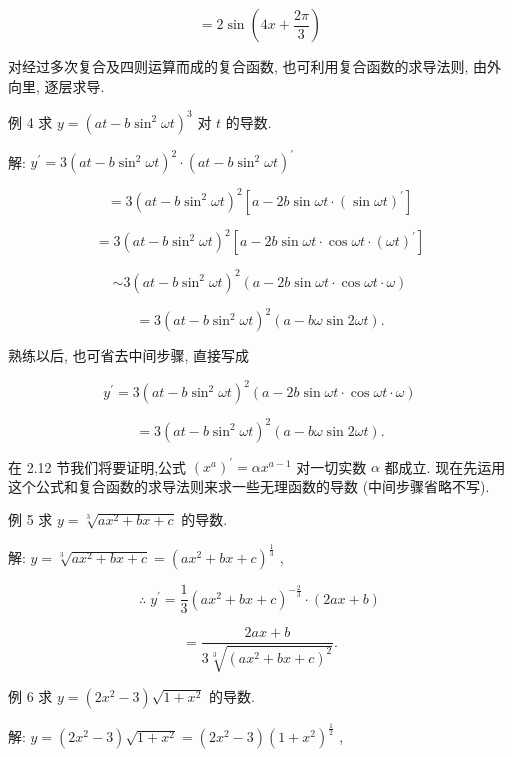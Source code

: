 \documentclass[lang=cn,newtx,12pt,scheme=chinese]{elegantbook}
\begin{document}
\[
= 2\sin \left( {{4x} + \frac{2\pi }{3}}\right)
\]

对经过多次复合及四则运算而成的复合函数, 也可利用复合函数的求导法则, 由外向里, 逐层求导.

例 4 求 \(y = {\left( at - b{\sin }^{2}\omega t\right) }^{3}\) 对 \(t\) 的导数.

解: \({y}^{\prime } = 3{\left( at - b{\sin }^{2}\omega t\right) }^{2} \cdot {\left( at - b{\sin }^{2}\omega t\right) }^{\prime }\)

\[
= 3{\left( at - b{\sin }^{2}\omega t\right) }^{2}\left\lbrack {a - {2b}\sin {\omega t} \cdot {\left( \sin \omega t\right) }^{\prime }}\right\rbrack
\]

\[
= 3{\left( at - b{\sin }^{2}\omega t\right) }^{2}\left\lbrack {a - {2b}\sin {\omega t} \cdot \cos {\omega t} \cdot {\left( \omega t\right) }^{\prime }}\right\rbrack
\]

\[
\sim 3{\left( at - b{\sin }^{2}\omega t\right) }^{2}\left( {a - {2b}\sin {\omega t} \cdot \cos {\omega t} \cdot \omega }\right)
\]

\[
= 3{\left( at - b{\sin }^{2}\omega t\right) }^{2}\left( {a - {b\omega }\sin {2\omega t}}\right) \text{.}
\]

熟练以后, 也可省去中间步骤, 直接写成

\[
{y}^{\prime } = 3{\left( at - b{\sin }^{2}\omega t\right) }^{2}\left( {a - {2b}\sin {\omega t} \cdot \cos {\omega t} \cdot \omega }\right)
\]

\[
= 3{\left( at - b{\sin }^{2}\omega t\right) }^{2}\left( {a - {b\omega }\sin {2\omega t}}\right) \text{.}
\]

在 2.12 节我们将要证明,公式 \({\left( {x}^{a}\right) }^{\prime } = \alpha {x}^{a - 1}\) 对一切实数 \(\alpha\) 都成立. 现在先运用这个公式和复合函数的求导法则来求一些无理函数的导数 (中间步骤省略不写).

例 5 求 \(y = \sqrt[3]{a{x}^{2} + {bx} + c}\) 的导数.

解: \(y = \sqrt[3]{a{x}^{2} + {bx} + c} = {\left( a{x}^{2} + bx + c\right) }^{\frac{1}{3}}\) ,

\[
\therefore \;{y}^{\prime } = \frac{1}{3}{\left( a{x}^{2} + bx + c\right) }^{-\frac{2}{3}} \cdot \left( {{2ax} + b}\right)
\]

\[
= \frac{{2ax} + b}{3\sqrt[3]{{\left( a{x}^{2} + bx + c\right) }^{2}}}.
\]

例 6 求 \(y = \left( {2{x}^{2} - 3}\right) \sqrt{1 + {x}^{2}}\) 的导数.

解: \(y = \left( {2{x}^{2} - 3}\right) \sqrt{1 + {x}^{2}} = \left( {2{x}^{2} - 3}\right) {\left( 1 + {x}^{2}\right) }^{\frac{1}{2}}\) ,
\end{document}
